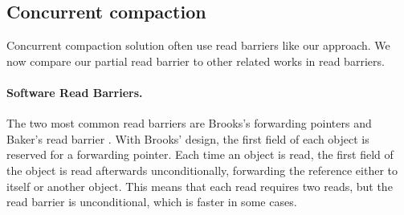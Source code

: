 \documentclass[sigplan,10pt,screen]{acmart}\settopmatter{printfolios=true,printccs=true,printacmref=true}
\begin{document}

\subsection{Concurrent compaction}
\label{sec:ConcCompactRel}

Concurrent compaction solution often use read barriers like our approach. We now compare our partial read barrier to other related works in read barriers.


\paragraph{Software Read Barriers.}
The two most common read barriers are Brooks's forwarding pointers \cite{BrooksForwarders} and Baker's read barrier \cite{BakerReadBarrier}.
With Brooks' design, the first field of each object is reserved for a forwarding pointer. Each time an object is read, the first field of the object is read afterwards unconditionally, forwarding the reference either to itself or another object. This means that each read requires two reads, but the read barrier is unconditional, which is faster in some cases.
\end{document}
